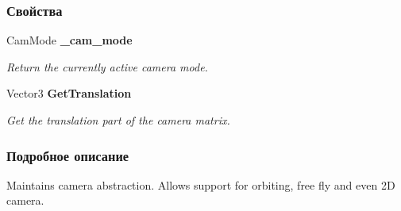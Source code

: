 \subsubsection*{Свойства}
\begin{DoxyCompactItemize}
\item 
Cam\+Mode {\bf \+\_\+cam\+\_\+mode}\hspace{0.3cm}{\ttfamily  [get]}\label{class_win_form_animation2_d_1_1_camera_device_a162958083b16cbc267e6f23c7392e2a5}

\begin{DoxyCompactList}\small\item\em Return the currently active camera mode. \end{DoxyCompactList}\item 
Vector3 {\bf Get\+Translation}\hspace{0.3cm}{\ttfamily  [get]}\label{class_win_form_animation2_d_1_1_camera_device_a6b52b857e583f1524e339f87102d6050}

\begin{DoxyCompactList}\small\item\em Get the translation part of the camera matrix. \end{DoxyCompactList}\end{DoxyCompactItemize}


\subsubsection{Подробное описание}
Maintains camera abstraction. Allows support for orbiting, free fly and even 2D camera. 

